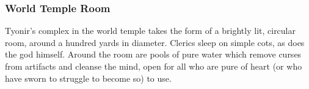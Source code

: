\subsubsection*{World Temple Room}
Tyonir's complex in the world temple takes the form of a brightly lit, circular room, around a hundred yards in diameter.
Clerics sleep on simple cots, as does the god himself.
Around the room are pools of pure water which remove curses from artifacts and cleanse the mind, open for all who are pure of heart (or who have sworn to struggle to become so) to use.
